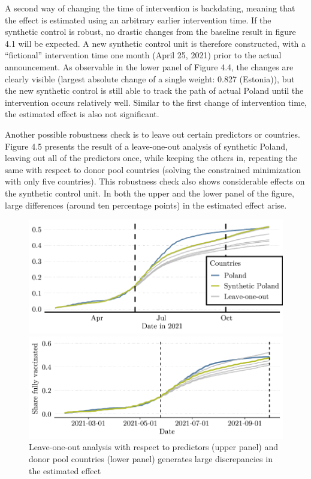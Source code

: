 \documentclass{scrbook}
\begin{document}
A second way of changing the time of intervention is backdating, meaning
that the effect is estimated using an arbitrary earlier intervention
time. If the synthetic control is robust, no drastic changes from the
baseline result in figure 4.1 will be expected. A new synthetic control
unit is therefore constructed, with a ``fictional'' intervention time
one month (April 25, 2021) prior to the actual announcement. As
observable in the lower panel of Figure 4.4, the changes are clearly
visible (largest absolute change of a single weight: 0.827 (Estonia)),
but the new synthetic control is still able to track the path of actual
Poland until the intervention occurs relatively well. Similar to the
first change of intervention time, the estimated effect is also not
significant.

Another possible robustness check is to leave out certain predictors or
countries. Figure 4.5 presents the result of a leave-one-out analysis of
synthetic Poland, leaving out all of the predictors once, while keeping
the others in, repeating the same with respect to donor pool countries
(solving the constrained minimization with only five countries). This
robustness check also shows considerable effects on the synthetic
control unit. In both the upper and the lower panel of the figure, large
differences (around ten percentage points) in the estimated effect
arise.

\begin{figure}[h]
\caption[Robustness check: Leave-one-out analysis]{Leave-one-out analysis with respect to predictors (upper panel) and donor pool countries (lower panel) generates large discrepancies in the estimated effect}

\begin{center}\includegraphics{bachelor_thesis_files/figure-latex/unnamed-chunk-6-1} \end{center}



\begin{center}\includegraphics{bachelor_thesis_files/figure-latex/unnamed-chunk-6-2} \end{center}
\end{figure}
\end{document}
